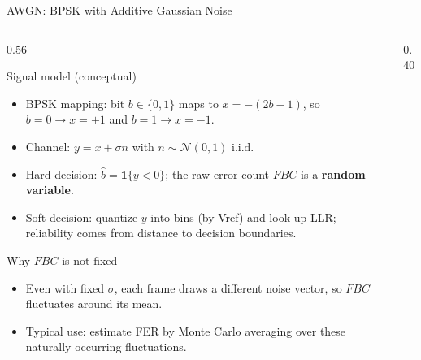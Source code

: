 \begin{frame}{AWGN: BPSK with Additive Gaussian Noise}
\vspace{-0.2cm}
\begin{columns}
  \begin{column}{0.56\textwidth}
    \begin{block}{Signal model (conceptual)}
      \begin{itemize}
        \item BPSK mapping: bit $b\in\{0,1\}$ maps to $x=-(2b-1)$, so $b=0\to x=+1$ and $b=1\to x=-1$.
        \item Channel: $y=x+\sigma n$ with $n\sim\mathcal{N}(0,1)$ i.i.d.
        \item Hard decision: $\hat b=\mathbf{1}\{y<0\}$; the raw error count $FBC$ is a \textbf{random variable}.
        \item Soft decision: quantize $y$ into bins (by Vref) and look up LLR; reliability comes from distance to decision boundaries.
      \end{itemize}
    \end{block}
    \begin{block}{Why $FBC$ is not fixed}
      \begin{itemize}
        \item Even with fixed $\sigma$, each frame draws a different noise vector, so $FBC$ fluctuates around its mean.
        \item Typical use: estimate FER by Monte Carlo averaging over these naturally occurring fluctuations.
      \end{itemize}
    \end{block}
  \end{column}
  \begin{column}{0.40\textwidth}
    \centering
  \end{column}
\end{columns}
\end{frame}

